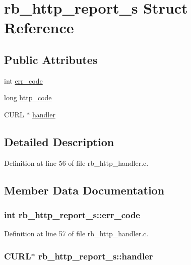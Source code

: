 \hypertarget{structrb__http__report__s}{\section{rb\-\_\-http\-\_\-report\-\_\-s Struct Reference}
\label{structrb__http__report__s}
}
\subsection*{Public Attributes}
\begin{DoxyCompactItemize}
\item 
int \hyperlink{structrb__http__report__s_a26726b20726473d985a703e0c7266d3f}{err\-\_\-code}
\item 
long \hyperlink{structrb__http__report__s_a44a22dfbde3f5d2c5eafba73f5be2afa}{http\-\_\-code}
\item 
C\-U\-R\-L $\ast$ \hyperlink{structrb__http__report__s_acbc5a7e21356d5e35d19363db4fed9ca}{handler}
\end{DoxyCompactItemize}


\subsection{Detailed Description}


Definition at line 56 of file rb\-\_\-http\-\_\-handler.\-c.



\subsection{Member Data Documentation}
\hypertarget{structrb__http__report__s_a26726b20726473d985a703e0c7266d3f}{
\subsubsection[{err\-\_\-code}]{\setlength{\rightskip}{0pt plus 5cm}int rb\-\_\-http\-\_\-report\-\_\-s\-::err\-\_\-code}}\label{structrb__http__report__s_a26726b20726473d985a703e0c7266d3f}


Definition at line 57 of file rb\-\_\-http\-\_\-handler.\-c.

\hypertarget{structrb__http__report__s_acbc5a7e21356d5e35d19363db4fed9ca}{
\subsubsection[{handler}]{\setlength{\rightskip}{0pt plus 5cm}C\-U\-R\-L$\ast$ rb\-\_\-http\-\_\-report\-\_\-s\-::handler}}\label{structrb__http__report__s_acbc5a7e21356d5e35d19363db4fed9ca}


